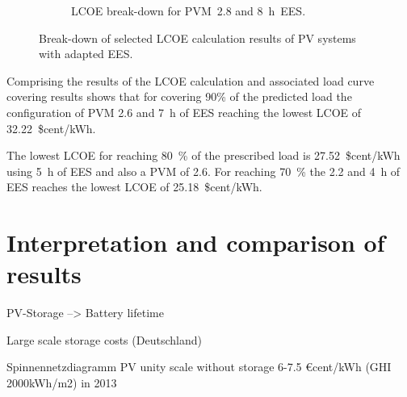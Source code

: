 \begin{figure}[!htbp]
\begin{subfigure}[b]{0.5\textwidth}
                \caption{LCOE break-down for PVM~2.8 and 8~h~EES.}\label{PV_LCOE_highinvest_BreakDown}
        \end{subfigure}
        \caption[Break-down of selected LCOE calculation  results of PV systems with adapted EES.]{Break-down of selected LCOE calculation results of PV systems with adapted EES.}\label{SMPV_LCOE_BreakDown}
\end{figure}
Comprising the results of the LCOE calculation and associated load curve covering results shows that for covering 90\% of the predicted load the configuration of PVM 2.6 and 7~h of EES reaching the lowest LCOE of 32.22~\$cent/kWh.

The lowest LCOE for reaching 80~\% of the prescribed load is 27.52~\$cent/kWh using 5~h of EES and also a PVM of 2.6. For reaching 70~\% the 2.2 and 4~h of EES reaches the lowest LCOE of 25.18~\$cent/kWh.
\pagebreak

\section{Interpretation and comparison of results}
PV-Storage --> Battery lifetime

Large scale storage costs (Deutschland)

Spinnennetzdiagramm 
PV unity scale without storage 
6-7.5 €cent/kWh (GHI 2000kWh/m2) in 2013 \cite{FraunhoferISE2013}\\\\

